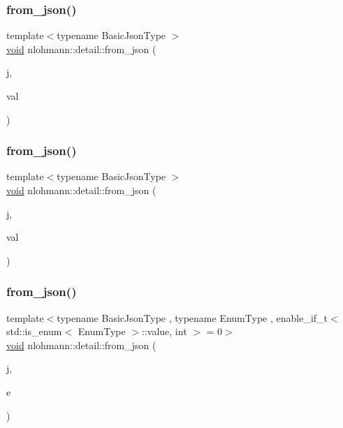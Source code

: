 \subsubsection{\texorpdfstring{from\_json()}{from\_json()}\hspace{0.1cm}{\footnotesize\ttfamily [6/18]}}
{\footnotesize\ttfamily template$<$typename Basic\+Json\+Type $>$ \\
\mbox{\hyperlink{namespacenlohmann_1_1detail_a59fca69799f6b9e366710cb9043aa77d}{void}} nlohmann\+::detail\+::from\+\_\+json (\begin{DoxyParamCaption}\item[{const Basic\+Json\+Type \&}]{j,  }\item[{typename Basic\+Json\+Type\+::number\+\_\+unsigned\+\_\+t \&}]{val }\end{DoxyParamCaption})}

\mbox{\label{namespacenlohmann_1_1detail_a047d881e611fcac709dc318f730a1732}} 
\subsubsection{\texorpdfstring{from\_json()}{from\_json()}\hspace{0.1cm}{\footnotesize\ttfamily [7/18]}}
{\footnotesize\ttfamily template$<$typename Basic\+Json\+Type $>$ \\
\mbox{\hyperlink{namespacenlohmann_1_1detail_a59fca69799f6b9e366710cb9043aa77d}{void}} nlohmann\+::detail\+::from\+\_\+json (\begin{DoxyParamCaption}\item[{const Basic\+Json\+Type \&}]{j,  }\item[{typename Basic\+Json\+Type\+::number\+\_\+integer\+\_\+t \&}]{val }\end{DoxyParamCaption})}

\mbox{\label{namespacenlohmann_1_1detail_a5440d650150d01e8015133521351b459}} 
\subsubsection{\texorpdfstring{from\_json()}{from\_json()}\hspace{0.1cm}{\footnotesize\ttfamily [8/18]}}
{\footnotesize\ttfamily template$<$typename Basic\+Json\+Type , typename Enum\+Type , enable\+\_\+if\+\_\+t$<$ std\+::is\+\_\+enum$<$ Enum\+Type $>$\+::value, int $>$  = 0$>$ \\
\mbox{\hyperlink{namespacenlohmann_1_1detail_a59fca69799f6b9e366710cb9043aa77d}{void}} nlohmann\+::detail\+::from\+\_\+json (\begin{DoxyParamCaption}\item[{const Basic\+Json\+Type \&}]{j,  }\item[{Enum\+Type \&}]{e }\end{DoxyParamCaption})}

